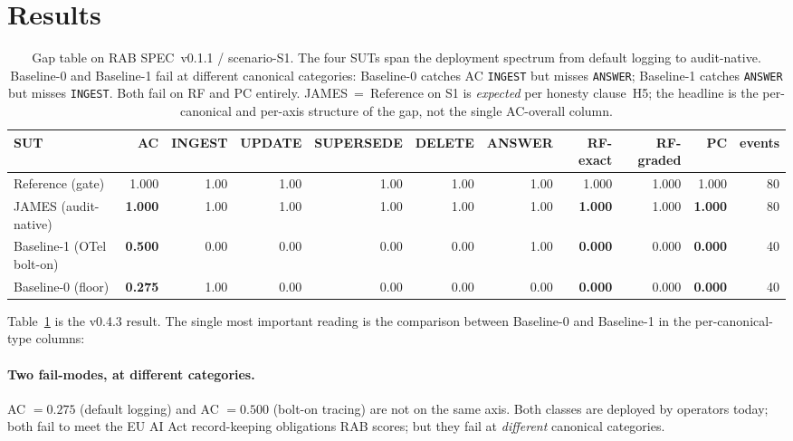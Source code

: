 \documentclass[11pt,a4paper]{article}
\begin{document}
\section{Results}
\label{sec:results}

\begin{table}[t]
\centering
\caption{Gap table on RAB SPEC~v0.1.1 / scenario-S1. The four SUTs span the deployment spectrum from default logging to audit-native. Baseline-0 and Baseline-1 fail at different canonical categories: Baseline-0 catches AC \texttt{INGEST} but misses \texttt{ANSWER}; Baseline-1 catches \texttt{ANSWER} but misses \texttt{INGEST}. Both fail on RF and PC entirely. JAMES~=~Reference on S1 is \emph{expected} per honesty clause~H5; the headline is the per-canonical and per-axis structure of the gap, not the single AC-overall column.}
\label{tab:gap}
\small
\setlength{\tabcolsep}{4pt}
\begin{tabular}{lrrrrrrrrrr}
\toprule
\textbf{SUT} & \textbf{AC} & \textbf{INGEST} & \textbf{UPDATE} & \textbf{SUPERSEDE} & \textbf{DELETE} & \textbf{ANSWER} & \textbf{RF-exact} & \textbf{RF-graded} & \textbf{PC} & \textbf{events} \\
\midrule
Reference (gate)         & 1.000 & 1.00 & 1.00 & 1.00 & 1.00 & 1.00 & 1.000 & 1.000 & 1.000 & 80 \\
JAMES (audit-native)     & \textbf{1.000} & 1.00 & 1.00 & 1.00 & 1.00 & 1.00 & \textbf{1.000} & 1.000 & \textbf{1.000} & 80 \\
Baseline-1 (OTel bolt-on)& \textbf{0.500} & 0.00 & 0.00 & 0.00 & 0.00 & 1.00 & \textbf{0.000} & 0.000 & \textbf{0.000} & 40 \\
Baseline-0 (floor)       & \textbf{0.275} & 1.00 & 0.00 & 0.00 & 0.00 & 0.00 & \textbf{0.000} & 0.000 & \textbf{0.000} & 40 \\
\bottomrule
\end{tabular}
\end{table}

Table~\ref{tab:gap} is the v0.4.3 result. The single most important reading is the comparison between Baseline-0 and Baseline-1 in the per-canonical-type columns:

\paragraph{Two fail-modes, at different categories.} AC $=0.275$ (default logging) and AC $=0.500$ (bolt-on tracing) are not on the same axis. Both classes are deployed by operators today; both fail to meet the EU AI Act record-keeping obligations RAB scores; but they fail at \emph{different} canonical categories.
\end{document}
